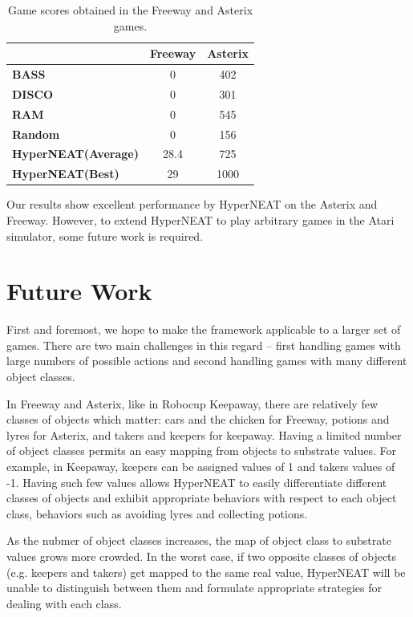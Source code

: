 \documentclass{acm_proc_article-sp}
\begin{document}
\begin{table}
\begin{center}
\begin{tabular}{|l|c|c|}
\hline
~ & \textbf{Freeway} & \textbf{Asterix} \\ \hline
\textbf{BASS} & 0 & 402 \\ \hline
\textbf{DISCO} & 0 & 301 \\ \hline
\textbf{RAM} & 0 & 545 \\ \hline
\textbf{Random} & 0 & 156 \\ \hline
\textbf{HyperNEAT(Average)} & 28.4 & 725 \\ \hline
\textbf{HyperNEAT(Best)} & 29 & 1000 \\ 
\hline
\end{tabular}
\end{center}
\label{tab:results-table}
\caption{Game scores obtained in the Freeway and Asterix games.}
\end{table}

Our results show excellent performance by HyperNEAT on the Asterix and Freeway. However, to extend HyperNEAT to play arbitrary games in the Atari simulator, some future work is required.

\section{Future Work}
\label{sec:futurework}
First and foremost, we hope to make the framework applicable to a larger set of games. There are two main challenges in this regard -- first handling games with large numbers of possible actions and second handling games with many different object classes.

In Freeway and Asterix, like in Robocup Keepaway, there are relatively few classes of objects which matter: cars and the chicken for Freeway, potions and lyres for Asterix, and takers and keepers for keepaway. Having a limited number of object classes permits an easy mapping from objects to substrate values. For example, in Keepaway, keepers can be assigned values of 1 and takers values of -1. Having such few values allows HyperNEAT to easily differentiate different classes of objects and exhibit appropriate behaviors with respect to each object class, behaviors such as avoiding lyres and collecting potions.

As the nubmer of object classes increases, the map of object class to substrate values grows more crowded. In the worst case, if two opposite classes of objects (e.g. keepers and takers) get mapped to the same real value, HyperNEAT will be unable to distinguish between them and formulate appropriate strategies for dealing with each class.
\end{document}
